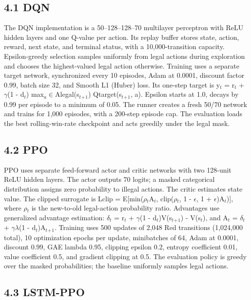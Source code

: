 \documentclass[11pt]{article}
\begin{document}
\subsection*{4.1 DQN}

The DQN implementation is a 50--128--128--70 multilayer perceptron with ReLU hidden layers and one Q-value per action. Its replay buffer stores state, action, reward, next state, and terminal status, with a 10,000-transition capacity. Epsilon-greedy selection samples uniformly from legal actions during exploration and chooses the highest-valued legal action otherwise. Training uses a separate target network, synchronized every 10 episodes, Adam at 0.0001, discount factor 0.99, batch size 32, and Smooth L1 (Huber) loss. Its one-step target is y$_t$ = r$_t$ + $\gamma$(1 - d$_t$) max$_a$$\in$Alegal(s$_t$$_+$$_1$) Qtarget(s$_t$$_+$$_1$, a). Epsilon starts at 1.0, decays by 0.99 per episode to a minimum of 0.05. The runner creates a fresh 50/70 network and trains for 1,000 episodes, with a 200-step episode cap. The evaluation loads the best rolling-win-rate checkpoint and acts greedily under the legal mask.

\subsection*{4.2 PPO}

PPO uses separate feed-forward actor and critic networks with two 128-unit ReLU hidden layers. The actor outputs 70 logits; a masked categorical distribution assigns zero probability to illegal actions. The critic estimates state value. The clipped surrogate is Lclip = E[min($\rho$$_t$A$_t$, clip($\rho$$_t$, 1 - $\epsilon$, 1 + $\epsilon$)A$_t$)], where $\rho$$_t$ is the new-to-old legal-action probability ratio. Advantages use generalized advantage estimation: $\delta$$_t$ = r$_t$ + $\gamma$(1 - d$_t$)V(s$_t$$_+$$_1$) - V(s$_t$), and A$_t$ = $\delta$$_t$ + $\gamma$$\lambda$(1 - d$_t$)A$_t$$_+$$_1$. Training uses 500 updates of 2,048 Red transitions (1,024,000 total), 10 optimization epochs per update, minibatches of 64, Adam at 0.0001, discount 0.99, GAE lambda 0.95, clipping epsilon 0.2, entropy coefficient 0.01, value coefficient 0.5, and gradient clipping at 0.5. The evaluation policy is greedy over the masked probabilities; the baseline uniformly samples legal actions.

\subsection*{4.3 LSTM-PPO}
\end{document}
